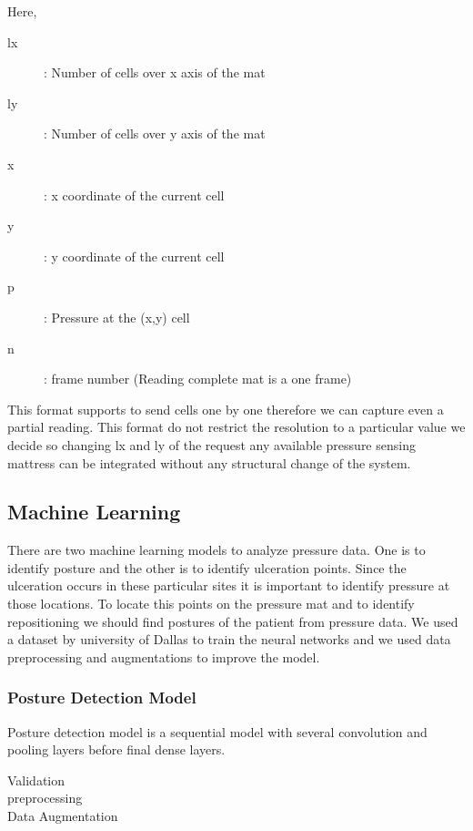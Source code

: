 Here,

\begin{description}
	\item[lx]: Number of cells over x axis of the mat 
	\item[ly]: Number of cells over y axis of the mat 
	\item[x]: x coordinate of the current cell 
	\item[y]: y coordinate of the current cell  
	\item[p]: Pressure at the (x,y) cell
	\item[n]: frame number (Reading complete mat is a one frame)  
\end{description}

This format supports to send cells one by one therefore we can capture even a partial reading. This format do not restrict the resolution to a particular value we decide so changing lx and ly of the request any available pressure sensing mattress can be integrated without any structural change of the system. 

\subsection{Machine Learning}

There are two machine learning models to analyze pressure data. One is to identify posture and the other is to identify ulceration points. Since the ulceration occurs in these particular sites it is important to identify pressure at those locations. To locate this points on the pressure mat and to identify repositioning we should find postures of the patient from pressure data. 
We used a dataset by university of Dallas to train the neural networks and we used data preprocessing and augmentations to improve the model.

\subsubsection{Posture Detection Model}

Posture detection model is a sequential model with several convolution and pooling layers before final dense layers. 

\begin{description}
	\item[Validation]
	\item[preprocessing]
	\item[Data Augmentation]   
\end{description}

